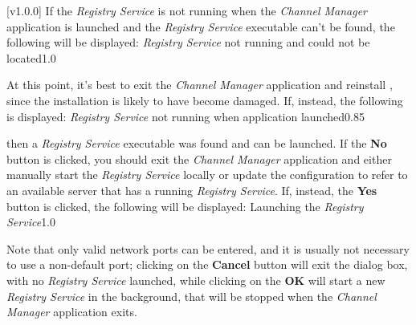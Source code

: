[v1.0.0]
If the \emph{Registry Service} is not running when the \emph{Channel Manager} application
is launched and the \emph{Registry Service} executable can't be found, the following will
be displayed:
%
{\emph{Registry Service} not running and could not be located}{1.0}

At this point, it's best to exit the \emph{Channel Manager} application and reinstall
\mplusm{}, since the installation is likely to have become damaged.
If, instead, the following is displayed:
%
{\emph{Registry Service} not running when application launched}{0.85}

then a \emph{Registry Service} executable was found and can be launched.
If the \textbf{No} button is clicked, you should exit the \emph{Channel Manager}
application and either manually start the \emph{Registry Service} locally or update the
\yarp{} configuration to refer to an available \yarp{} server that has a running
\emph{Registry Service}.
\clearpage
If, instead, the \textbf{Yes} button is clicked, the following will be displayed:
%
{Launching the \emph{Registry Service}}{1.0}

Note that only valid network ports can be entered, and it is usually not necessary to use
a non-default port; clicking on the \textbf{Cancel} button will exit the dialog box, with
no \emph{Registry Service} launched, while clicking on the \textbf{OK} will start a new
\emph{Registry Service} in the background, that will be stopped when the
\emph{Channel Manager} application exits.
\appendixEnd{}
